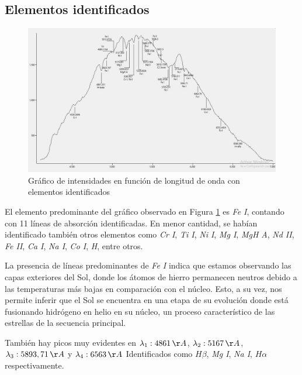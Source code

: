 \documentclass[11pt, a4paper]{article}
\begin{document}
\subsection{Elementos identificados}

\begin{figure}[H]
    \centering
    \includegraphics[width=1\linewidth]{images/grafico-elementos-completos.jpg}
    \captionsetup{justification=centering}
    \caption{Gráfico de intensidades en función de longitud de onda con elementos identificados}
    \label{fig:calibrado-con-elementos}
\end{figure}
El elemento predominante del gráfico observado en Figura \ref{fig:calibrado-con-elementos} es \textit{Fe I}, contando con 11 líneas de absorción identificadas. En menor cantidad, se habían identificado también otros elementos como \textit{Cr I}, \textit{Ti I}, \textit{Ni I}, \textit{Mg I}, \textit{MgH A},  \textit{Nd II}, \textit{Fe II}, \textit{Ca I}, \textit{Na I}, \textit{Co I}, \textit{H},  entre otros. 

La presencia de líneas predominantes de \textit{Fe I} indica que estamos observando las capas exteriores del Sol, donde los átomos de hierro permanecen neutros debido a las temperaturas más bajas en comparación con el núcleo. Esto, a su vez, nos permite inferir que el Sol se encuentra en una etapa de su evolución donde está fusionando hidrógeno en helio en su núcleo, un proceso característico de las estrellas de la secuencia principal.

También hay picos muy evidentes en $\lambda _1: 4861 \,\AA$, $\lambda _2: 5167 \,\AA$, ${\lambda _3: 5893,71 \,\AA}$ y $\lambda _4: 6563 \,\AA$ Identificados como $H \beta$, \textit{ Mg I}, \textit{Na I}, $H \alpha$ respectivamente.
\end{document}
